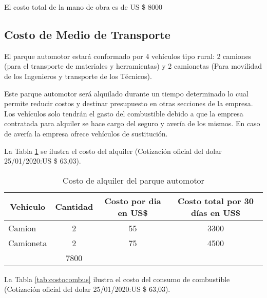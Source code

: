 El costo total de la mano de obra es de US \$ 8000

\subsection{Costo de Medio de Transporte}

El parque automotor estará conformado por 4 vehículos tipo rural: 2 camiones (para el transporte de materiales y herramientas) y 2 camionetas (Para movilidad de los Ingenieros y transporte de los Técnicos).

Este parque automotor será alquilado durante un tiempo determinado lo cual permite reducir costos y destinar presupuesto en otras secciones de la empresa. Los vehículos solo tendrán el gasto del combustible debido a que la empresa contratada para alquiler se hace cargo del seguro y avería de los mismos. En caso de avería la empresa ofrece vehículos de sustitución.

La Tabla \ref{tab:costomovilidad} se ilustra el costo del alquiler (Cotización oficial del dolar 25/01/2020:US \$ 63,03).

\begin{table}[H]
  \centering
    \begin{tabular}{|c|c|c|c|}
    \hline
    \rowcolor[rgb]{ .773,  .851,  .945} \textbf{Vehiculo} & \textbf{Cantidad} & \textbf{Costo por dia en US\$} & \textbf{Costo total por 30 días en US\$} \bigstrut\\
    \hline
    \multicolumn{1}{|l|}{Camion} & 2     & 55    & 3300 \bigstrut\\
    \hline
    \multicolumn{1}{|l|}{Camioneta} & 2     & 75    & 4500 \bigstrut\\
    \hline
    \rowcolor[rgb]{ .773,  .851,  .945} \multicolumn{3}{|c|}{\textbf{Total}} & \cellcolor[rgb]{ 1,  1,  1}7800 \bigstrut\\
    \hline
    \end{tabular}%
  \caption{Costo de alquiler del parque automotor}
  \label{tab:costomovilidad}%
\end{table}%

La Tabla \ref{tab:costocombus} ilustra el costo del consumo de combustible (Cotización oficial del dolar 25/01/2020:US \$ 63,03).


